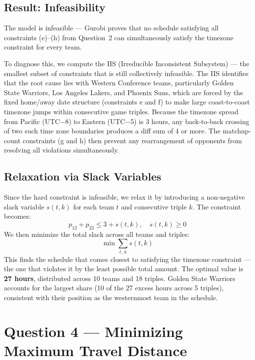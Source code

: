 \documentclass[11pt, letterpaper]{article}
\begin{document}
\subsection{Result: Infeasibility}

The model is infeasible --- Gurobi proves that no schedule satisfying all
constraints (e)--(h) from Question~2 can simultaneously satisfy the timezone
constraint for every team.

To diagnose this, we compute the IIS (Irreducible Inconsistent Subsystem) ---
the smallest subset of constraints that is still collectively infeasible. The
IIS identifies that the root cause lies with Western Conference teams,
particularly Golden State Warriors, Los Angeles Lakers, and Phoenix Suns, which
are forced by the fixed home/away date structure (constraints e and f) to make
large coast-to-coast timezone jumps within consecutive game triples. Because the
timezone spread from Pacific (UTC$-$8) to Eastern (UTC$-$5) is 3 hours, any
back-to-back crossing of two such time zone boundaries produces a diff sum of 4
or more. The matchup-count constraints (g and h) then prevent any rearrangement
of opponents from resolving all violations simultaneously.

\subsection{Relaxation via Slack Variables}

Since the hard constraint is infeasible, we relax it by introducing a
non-negative slack variable $s(t,k)$ for each team $t$ and consecutive triple
$k$. The constraint becomes:
\[
  p_{12} + p_{23} \leq 3 + s(t,k), \quad s(t,k) \geq 0
\]
We then minimize the total slack across all teams and triples:
\[
  \min \sum_{t,\,k} s(t,k)
\]
This finds the schedule that comes closest to satisfying the timezone constraint
--- the one that violates it by the least possible total amount. The optimal
value is \textbf{27 hours}, distributed across 10 teams and 18 triples. Golden
State Warriors accounts for the largest share (10 of the 27 excess hours across
5 triples), consistent with their position as the westernmost team in the
schedule.

\section{Question 4 --- Minimizing Maximum Travel Distance}
\end{document}
